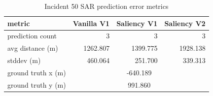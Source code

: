 \begin{table}[ht]
\centering
\caption{Incident 50 SAR prediction error metrics}
\label{tab:sar-incident-50}
\begin{tabular}{lrrr}
\hline
metric & Vanilla V1 & Saliency V1 & Saliency V2 \\
\hline
prediction count & 3 & 3 & 3 \\
avg distance (m) & 1262.807 & 1399.775 & 1928.138 \\
stddev (m) & 460.064 & 251.700 & 339.313 \\
ground truth x (m) & \multicolumn{3}{c}{-640.189} \\
ground truth y (m) & \multicolumn{3}{c}{991.860} \\
\hline
\end{tabular}
\end{table}
